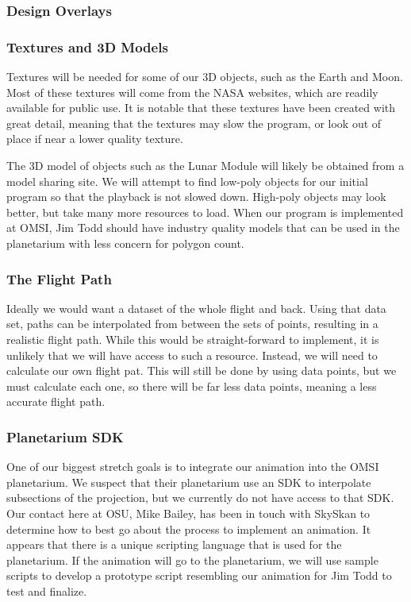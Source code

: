 \documentclass[onecolumn, draftclsnofoot,10pt, compsoc]{IEEEtran}
\begin{document}
    \subsubsection{Design Overlays}
	
	\subsubsection{Textures and 3D Models}
	Textures will be needed for some of our 3D objects, such as the Earth and Moon. Most of these textures will come from the NASA websites, which are readily available for public use. It is notable that these textures have been created with great detail, meaning that the textures may slow the program, or look out of place if near a lower quality texture. 
	
	The 3D model of objects such as the Lunar Module will likely be obtained from a model sharing site. We will attempt to find low-poly objects for our initial program so that the playback is not slowed down. High-poly objects may look better, but take many more resources to load. When our program is implemented at OMSI, Jim Todd should have industry quality models that can be used in the planetarium with less concern for polygon count. 
	
	\subsubsection{The Flight Path}
	Ideally we would want a dataset of the whole flight and back. Using that data set, paths can be interpolated from between the sets of points, resulting in a realistic flight path. While this would be straight-forward to implement, it is unlikely that we will have access to such a resource. Instead, we will need to calculate our own flight pat. This will still be done by using data points, but we must calculate each one, so there will be far less data points, meaning a less accurate flight path.
	
	\subsubsection{Planetarium SDK}
	One of our biggest stretch goals is to integrate our animation into the OMSI planetarium. We suspect that their planetarium use an SDK to interpolate subsections of the projection, but we currently do not have access to that SDK. Our contact here at OSU, Mike Bailey, has been in touch with SkySkan to determine how to best go about the process to implement an animation. It appears that there is a unique scripting language that is used for the planetarium. If the animation will go to the planetarium, we will use sample scripts to develop a prototype script resembling our animation for Jim Todd to test and finalize. 
    
\end{document}
